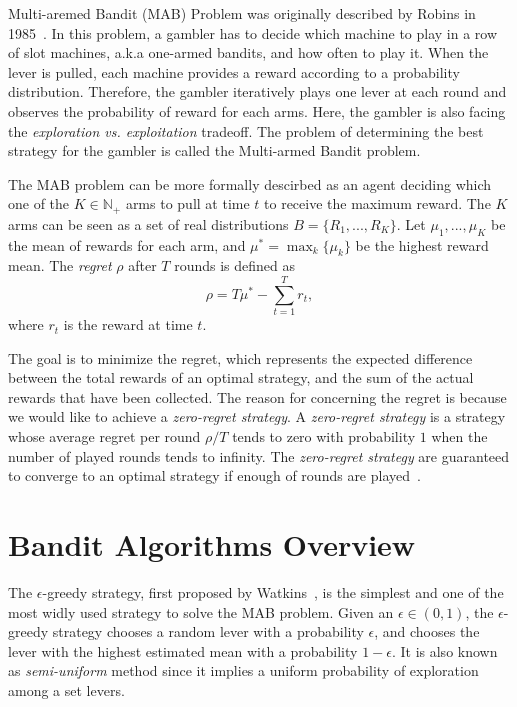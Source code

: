 Multi-aremed Bandit (MAB) Problem was originally described by Robins in 1985~\cite{Robbins:1985:MAB}.
In this problem, a gambler has to decide which machine to play in a row of slot machines, a.k.a one-armed bandits, and how often to play it.
When the lever is pulled, each machine provides a reward according to a probability distribution.
Therefore, the gambler iteratively plays one lever at each round and observes the probability of reward for each arms.
Here, the gambler is also facing the \textit{exploration vs. exploitation} tradeoff.
The problem of determining the best strategy for the gambler is called the Multi-armed Bandit problem.


The MAB problem can be more formally descirbed as 
an agent deciding which one of the $K \in \mathbb{N}_+$ arms to pull at time $t$ to receive the maximum reward.
The $K$ arms can be seen as a set of real distributions $B = \{ R_1, ..., R_K \} $.
Let $\mu_1, ..., \mu_K$ be the mean of rewards for each arm, and $\mu^* = \max_{k} \{ \mu_k \}$ be the highest reward mean.
The \textit{regret} $\rho$ after $T$ rounds is defined as
\begin{displaymath}
\rho = T\mu^* - \sum_{t=1}^{T} r_t,
\end{displaymath}
where $r_t$ is the reward at time $t$.

The goal is to minimize the regret, which represents the expected difference between the total rewards of an optimal strategy,
and the sum of the actual rewards that have been collected.  
The reason for concerning the regret is because we would like to achieve a \textit{zero-regret strategy}.
A \textit{zero-regret strategy} is a strategy whose average regret per round $\rho / T$ tends to zero with probability $1$ 
when the number of played rounds tends to infinity.
The \textit{zero-regret strategy} are guaranteed to converge to an optimal strategy if enough of rounds are played~\cite{Vermorel:2005:MAB}.



\section{Bandit Algorithms Overview}

The $\epsilon$-greedy strategy, first proposed by Watkins~\cite{Watkins:1989:eta}, 
is the simplest and one of the most widly used strategy to solve the MAB problem.
Given an $\epsilon \in (0,1)$,
the $\epsilon$-greedy strategy chooses a random lever with a probability $\epsilon$, 
and chooses the lever with the highest estimated mean with a probability $1 - \epsilon$.
It is also known as \textit{semi-uniform} method since it implies a uniform probability of exploration among a set levers.

